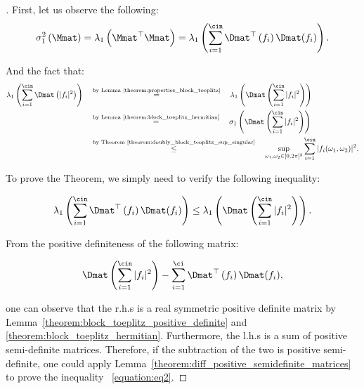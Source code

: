 \begin{proof}[]
First, let us observe the following:
\begin{equation}
    \sigma_1^2 \left( \Mmat \right) = \lambda_1 \left( \Mmat^{\top} \Mmat \right) = \lambda_1 \left( \sum_{i=1}^{\cin} \Dmat^{\top} \left(f_i \right) \Dmat (f_i) \right).
\end{equation}

And the fact that:
\begin{align}
    \lambda_1 \left( \sum_{i=1}^{\cin} \Dmat \left(|f_i|^2 \right) \right) \quad &\stackrel{\text{by Lemma~\ref{theorem:properties_block_toeplitz}}}{=} \quad \lambda_1 \left( \Dmat \left( \sum_{i=1}^{\cin} |f_i|^2 \right) \right) \\ 
    \quad &\stackrel{\text{by Lemma~\ref{theorem:block_toeplitz_hermitian}}}{=} \quad \sigma_1 \left( \Dmat \left( \sum_{i=1}^{\cin} |f_i|^2 \right) \right) \\
    \quad &\stackrel{\text{by Theorem~\ref{theorem:doubly_block_teoplitz_sup_singular}}}{\leq} \quad \sup_{\omega_1, \omega_2 \in [0, 2\pi]^2} \sum_{i=1}^{\cin} |f_i(\omega_1, \omega_2)|^2.
\end{align}

To prove the Theorem, we simply need to verify the following inequality:

\begin{equation}
    \lambda_1 \left( \sum_{i=1}^{\cin} \Dmat^{\top} \left(f_i \right) \Dmat (f_i) \right) \leq \lambda_1 \left( \Dmat \left( \sum_{i=1}^{\cin} |f_i|^2 \right) \right). \label{equation:eq2}
\end{equation}

From the positive definiteness of the following matrix:

\begin{equation}
    \Dmat \left( \sum_{i=1}^{\cin} |f_i|^2 \right) - \sum_{i=1}^{\ci} \Dmat^{\top} \left(f_i \right) \Dmat (f_i),
\end{equation}

one can observe that the r.h.s is a real symmetric positive definite matrix by Lemma~\ref{theorem:block_toeplitz_positive_definite} and \ref{theorem:block_toeplitz_hermitian}. Furthermore, the l.h.s is a sum of positive semi-definite matrices. Therefore, if the subtraction of the two is positive semi-definite, one could apply Lemma~\ref{theorem:diff_positive_semidefinite_matrices} to prove the inequality
~\ref{equation:eq2}. 



\end{proof}
